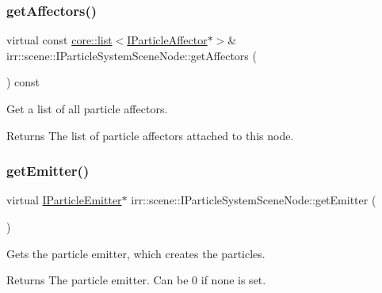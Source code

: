 \subsubsection{\texorpdfstring{get\+Affectors()}{getAffectors()}}
{\footnotesize\ttfamily virtual const \hyperlink{classirr_1_1core_1_1list}{core\+::list}$<$\hyperlink{classirr_1_1scene_1_1IParticleAffector}{I\+Particle\+Affector}$\ast$$>$\& irr\+::scene\+::\+I\+Particle\+System\+Scene\+Node\+::get\+Affectors (\begin{DoxyParamCaption}{ }\end{DoxyParamCaption}) const\hspace{0.3cm}{\ttfamily [pure virtual]}}



Get a list of all particle affectors. 

\begin{DoxyReturn}{Returns}
The list of particle affectors attached to this node. 
\end{DoxyReturn}
\mbox{\label{classirr_1_1scene_1_1IParticleSystemSceneNode_a2f1a12f030ad5aadfd8d1be24021c7d5}} 
\subsubsection{\texorpdfstring{get\+Emitter()}{getEmitter()}}
{\footnotesize\ttfamily virtual \hyperlink{classirr_1_1scene_1_1IParticleEmitter}{I\+Particle\+Emitter}$\ast$ irr\+::scene\+::\+I\+Particle\+System\+Scene\+Node\+::get\+Emitter (\begin{DoxyParamCaption}{ }\end{DoxyParamCaption})\hspace{0.3cm}{\ttfamily [pure virtual]}}



Gets the particle emitter, which creates the particles. 

\begin{DoxyReturn}{Returns}
The particle emitter. Can be 0 if none is set. 
\end{DoxyReturn}
\mbox{\label{classirr_1_1scene_1_1IParticleSystemSceneNode_aececff4531482ce976f1859c40bf3f76}} 

